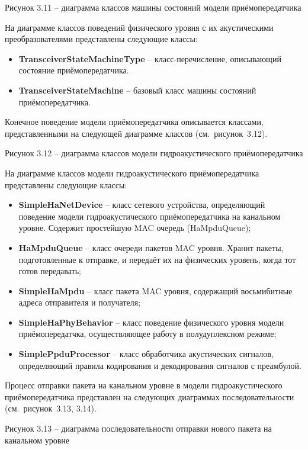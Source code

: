 Рисунок 3.11 -- диаграмма классов машины состояний модели
приёмопередатчика

На диаграмме классов поведений физического уровня с их акустическими
преобразователями представлены следующие классы:

\begin{itemize}
\item
  \textbf{TransceiverStateMachineType} -- класс-перечисление,
  описывающий состояние приёмопередатчика.
\item
  \textbf{TransceiverStateMachine} -- базовый класс машины состояний
  приёмопередатчика.
\end{itemize}

Конечное поведение модели приёмопередатчика описывается классами,
представленными на следующей диаграмме классов (см.~рисунок~3.12).

Рисунок 3.12 -- диаграмма классов модели гидроакустического
приёмопередатчика

На диаграмме классов модели гидроакустического приёмопередатчика
представлены следующие классы:

\begin{itemize}
\item
  \textbf{SimpleHaNetDevice} -- класс сетевого устройства, определяющий
  поведение модели гидроакустического приёмопередатчика на канальном
  уровне. Содержит простейшую MAC очередь (HaMpduQueue);
\item
  \textbf{HaMpduQueue} -- класс очереди пакетов MAC уровня. Хранит
  пакеты, подготовленные к отправке, и передаёт их на физических
  уровень, когда тот готов передавать;
\item
  \textbf{SimpleHaMpdu} -- класс пакета MAC уровня, содержащий
  восьмибитные адреса отправителя и получателя;
\item
  \textbf{SimpleHaPhyBehavior} -- класс поведение физического уровня
  модели приёмопередатчка, осуществляющее работу в полудуплексном
  режиме;
\item
  \textbf{SimplePpduProcessor} -- класс обработчика акустических
  сигналов, определяющий правила кодирования и декодирования сигналов с
  преамбулой.
\end{itemize}

Процесс отправки пакета на канальном уровне в модели гидроакустического
приёмопередатчика представлен на следующих диаграммах последовательности
(см.~рисунок~3.13, 3.14).

Рисунок 3.13 -- диаграмма последовательности отправки нового пакета на
канальном уровне

